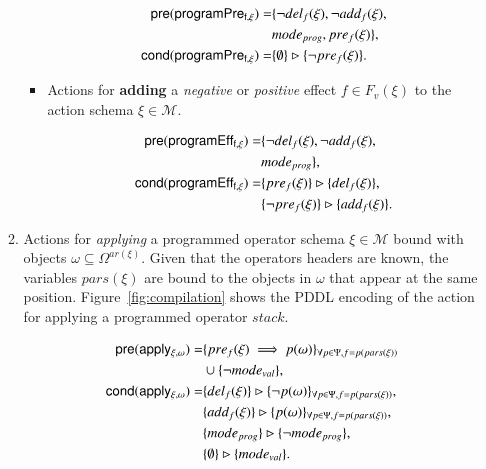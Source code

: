 \documentclass[3p,times]{elsarticle}
\newcommand{\pre}{\mathsf{pre}}  %
\newcommand{\cond}{\mathsf{cond}}   %
\begin{document}
\begin{itemize}
\begin{enumerate}
\begin{itemize}
\begin{small}
\begin{align*}
\hspace*{7pt}\pre(\mathsf{programPre_{f,\xi}})=&\{\neg del_{f}(\xi),\neg add_{f}(\xi),\\
& mode_{prog}, pre_{f}(\xi)\},\\
\cond(\mathsf{programPre_{f,\xi}})=&\{\emptyset\}\rhd\{\neg pre_{f}(\xi)\}.
\end{align*}
\end{small}

\item Actions for {\bf adding} a {\em negative} or {\em positive} effect $f\in F_v(\xi)$ to the action schema $\xi\in\mathcal{M}$.

\begin{small}
\begin{align*}
\hspace*{7pt}\pre(\mathsf{programEff_{f,\xi}})=&\{\neg del_{f}(\xi),\neg add_{f}(\xi),\\
& mode_{prog}\},\\
\cond(\mathsf{programEff_{f,\xi}})=&\{pre_{f}(\xi)\}\rhd\{del_{f}(\xi)\},\\
&\{\neg pre_{f}(\xi)\}\rhd\{add_{f}(\xi)\}.
\end{align*}
\end{small}
\end{itemize}

\item Actions for {\em applying} a programmed operator schema $\xi\in\mathcal{M}$ bound with objects $\omega\subseteq\Omega^{ar(\xi)}$. Given that the operators headers are known, the variables $pars(\xi)$ are bound to the objects in $\omega$ that appear at the same position. Figure~\ref{fig:compilation} shows the PDDL encoding of the action for applying a programmed operator $stack$.
\begin{small}
\begin{align*}
\hspace*{7pt}\pre(\mathsf{apply_{\xi,\omega}})=&\{pre_{f}(\xi)\implies p(\omega)\}_{\forall p\in\Psi,f=p(pars(\xi))}\\
&\cup \{\neg mode_{val}\},\\
\cond(\mathsf{apply_{\xi,\omega}})=&\{del_{f}(\xi)\}\rhd\{\neg p(\omega)\}_{\forall p\in\Psi,f=p(pars(\xi))},\\
&\{add_{f}(\xi)\}\rhd\{p(\omega)\}_{\forall p\in\Psi,f=p(pars(\xi))},\\
&\{mode_{prog}\}\rhd\{\neg mode_{prog}\},\\
&\{\emptyset\}\rhd\{mode_{val}\}.
\end{align*}
\end{small}


\end{enumerate}
\end{itemize}
\end{document}
